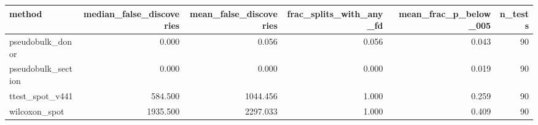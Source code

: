 \begin{tabular}{lrrrrr}
\toprule
method & median_false_discoveries & mean_false_discoveries & frac_splits_with_any_fd & mean_frac_p_below_005 & n_tests \\
\midrule
pseudobulk_donor & 0.000 & 0.056 & 0.056 & 0.043 & 90 \\
pseudobulk_section & 0.000 & 0.000 & 0.000 & 0.019 & 90 \\
ttest_spot_v441 & 584.500 & 1044.456 & 1.000 & 0.259 & 90 \\
wilcoxon_spot & 1935.500 & 2297.033 & 1.000 & 0.409 & 90 \\
\bottomrule
\end{tabular}
